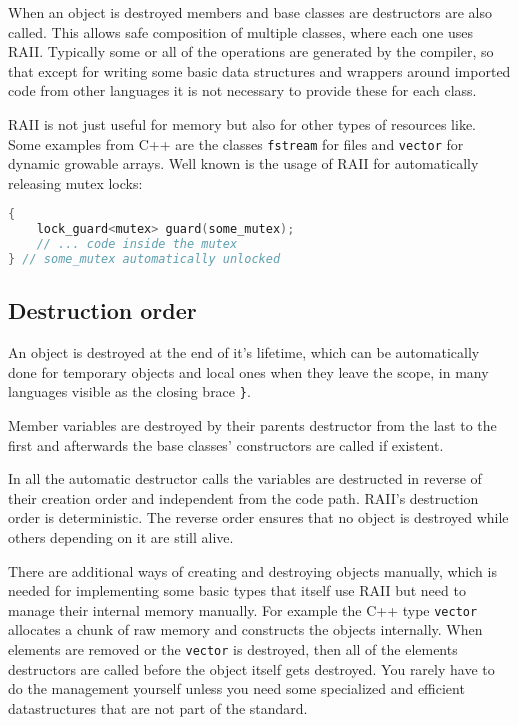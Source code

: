 \documentclass[conference,twocolumn]{IEEEtran}
\begin{document}
When an object is destroyed members and base classes are destructors are also called. This allows safe composition of multiple classes, where each one uses RAII.
Typically some or all of the operations are generated by the compiler, so that except for writing some basic data structures and wrappers around imported code from other languages it is not necessary to provide these for each class.

RAII is not just useful for memory but also for other types of resources like. Some examples from C++ are the classes \verb|fstream| for files and \verb|vector| for dynamic growable arrays. Well known is the usage of RAII for automatically releasing mutex locks:
\begin{lstlisting}[language=c++, frame=single]
{
    lock_guard<mutex> guard(some_mutex);
    // ... code inside the mutex
} // some_mutex automatically unlocked
\end{lstlisting}


\subsection{Destruction order}


An object is destroyed at the end of it's lifetime, which can be automatically done for temporary objects and local ones when they leave the scope, in many languages visible as the closing brace \verb|}|.

Member variables are destroyed by their parents destructor from the last to the first and afterwards the base classes' constructors are called if existent.

In all the automatic destructor calls the variables are destructed in reverse of their creation order and independent from the code path. RAII's destruction order is deterministic. The reverse order ensures that no object is destroyed while others depending on it are still alive.

There are additional ways of creating and destroying objects manually, which is needed for implementing some basic types that itself use RAII but need to manage their internal memory manually. For example the C++ type \verb|vector| allocates a chunk of raw memory and constructs the objects internally. When elements are removed or the \verb|vector| is destroyed, then all of the elements destructors are called before the object itself gets destroyed. You rarely have to do the management yourself unless you need some specialized and efficient datastructures that are not part of the standard.
\end{document}
